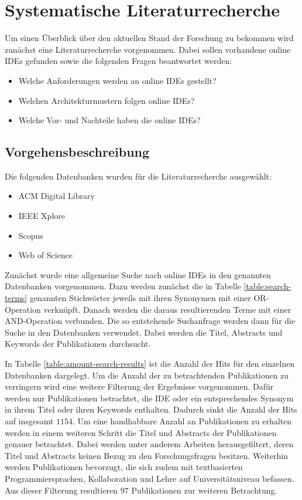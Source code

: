 \chapter{Systematische Literaturrecherche} \label{systematische_literaturrecherche}

Um einen Überblick über den aktuellen Stand der Forschung zu bekommen wird zunächst eine Literaturrecherche vorgenommen. Dabei sollen vorhandene online IDEs gefunden sowie die folgenden Fragen beantwortet werden:

\begin{itemize}
    \item Welche Anforderungen werden an online IDEs gestellt?
    \item Welchen Architekturmustern folgen online IDEs?
    \item Welche Vor- und Nachteile haben die online IDEs?
\end{itemize}

\section{Vorgehensbeschreibung}

Die folgenden Datenbanken wurden für die Literaturrecherche ausgewählt:

\begin{itemize}
    \item ACM Digital Library
    \item IEEE Xplore
    \item Scopus
    \item Web of Science
\end{itemize}

Zunächst wurde eine allgemeine Suche nach online IDEs in den genannten Datenbanken vorgenommen. Dazu werden zunächst die in Tabelle \ref{table:search-terms} genannten Stichwörter jeweils mit ihren Synonymen mit einer OR-Operation verknüpft. Danach werden die daraus resultierenden Terme mit einer AND-Operation verbunden. Die so entstehende Suchanfrage werden dann für die Suche in den Datenbanken verwendet. Dabei werden die Titel, Abstracts und Keywords der Publikationen durchsucht.

In Tabelle \ref{table:amount-search-results} ist die Anzahl der Hits für den einzelnen Datenbanken dargelegt. Um die Anzahl der zu betrachtenden Publikationen zu verringern wird eine weitere Filterung der Ergebnisse vorgenommen. Dafür werden nur Publikationen betrachtet, die IDE oder ein entsprechendes Synonym in ihrem Titel oder ihren Keywords enthalten. Dadurch sinkt die Anzahl der Hits auf insgesamt $1154$. Um eine handhabbare Anzahl an Publikationen zu erhalten werden in einem weiteren Schritt die Titel und Abstracts der Publikationen genauer betrachtet. Dabei werden unter anderem Arbeiten herausgefiltert, deren Titel und Abstracts keinen Bezug zu den Forschungsfragen besitzen. Weiterhin werden Publikationen bevorzugt, die sich zudem mit textbasierten Programmiersprachen, Kollaboration und Lehre auf Universitätsniveau befassen. Aus dieser Filterung resultieren $97$ Publikationen zur weiteren Betrachtung.

